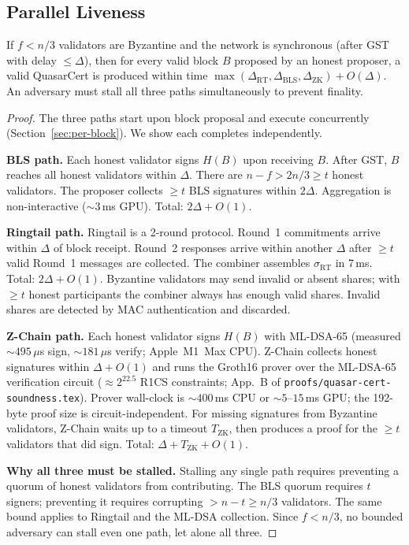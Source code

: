 \subsection{Parallel Liveness}

\begin{theorem}
\label{thm:par-liveness}
If $f < n/3$ validators are Byzantine and the network is synchronous
(after GST with delay $\leq \Delta$), then for every valid block $B$
proposed by an honest proposer, a valid QuasarCert is produced within
time $\max(\Delta_{\mathrm{RT}}, \Delta_{\mathrm{BLS}},
\Delta_{\mathrm{ZK}}) + O(\Delta)$.  An adversary must stall all three
paths simultaneously to prevent finality.
\end{theorem}

\begin{proof}
The three paths start upon block proposal and execute concurrently
(Section~\ref{sec:per-block}).  We show each completes independently.

\medskip
\textbf{BLS path.}
Each honest validator signs $H(B)$ upon receiving $B$.  After GST, $B$
reaches all honest validators within $\Delta$.  There are
$n - f > 2n/3 \geq t$ honest validators.  The proposer collects
$\geq t$ BLS signatures within $2\Delta$.  Aggregation is
non-interactive (${\sim}3$\,ms GPU).  Total: $2\Delta + O(1)$.

\medskip
\textbf{Ringtail path.}
Ringtail is a 2-round protocol.  Round~1 commitments arrive within
$\Delta$ of block receipt.  Round~2 responses arrive within another
$\Delta$ after $\geq t$ valid Round~1 messages are collected.  The
combiner assembles $\sigma_{\mathrm{RT}}$ in 7\,ms.  Total:
$2\Delta + O(1)$.  Byzantine validators may send invalid or absent
shares; with $\geq t$ honest participants the combiner always has
enough valid shares.  Invalid shares are detected by MAC authentication
and discarded.

\medskip
\textbf{Z-Chain path.}
Each honest validator signs $H(B)$ with ML-DSA-65 (measured
${\sim}495$\,$\mu$s sign, ${\sim}181$\,$\mu$s verify; Apple~M1~Max CPU).
Z-Chain collects honest signatures within $\Delta + O(1)$ and runs the
Groth16 prover over the ML-DSA-65 verification circuit
($\approx 2^{22.5}$ R1CS constraints; App.~B of
\texttt{proofs/quasar-cert-soundness.tex}).  Prover wall-clock is
${\sim}400$\,ms CPU or ${\sim}5$--$15$\,ms GPU; the 192-byte proof size
is circuit-independent.  For missing signatures from Byzantine validators,
Z-Chain waits up to a timeout $T_{\mathrm{ZK}}$, then produces a proof
for the $\geq t$ validators that did sign.
Total: $\Delta + T_{\mathrm{ZK}} + O(1)$.

\medskip
\textbf{Why all three must be stalled.}
Stalling any single path requires preventing a quorum of honest
validators from contributing.  The BLS quorum requires $t$ signers;
preventing it requires corrupting $> n - t \geq n/3$ validators.
The same bound applies to Ringtail and the ML-DSA collection.  Since
$f < n/3$, no bounded adversary can stall even one path, let alone all
three.
\end{proof}

